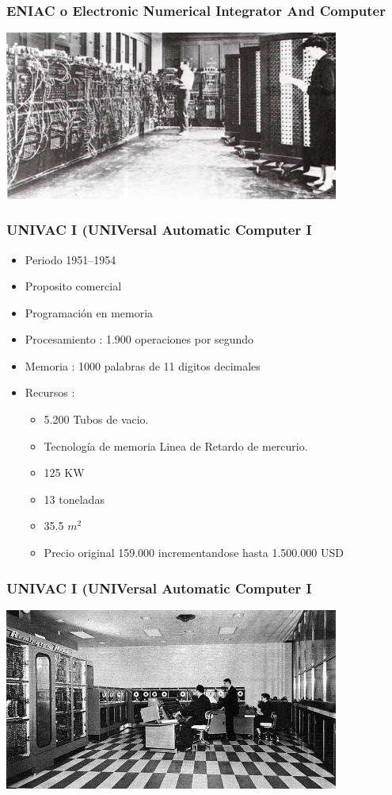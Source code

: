 \documentclass{beamer}
\begin{document}
\begin{frame}
\frametitle{ENIAC o Electronic Numerical Integrator And Computer}
\begin{center}
	\includegraphics[width=11cm]{ENIAC.png}
\end{center}
\end{frame}

\begin{frame}
	\frametitle{UNIVAC I (UNIVersal Automatic Computer I}
	\begin{itemize}
		\item Periodo 1951–1954
		\item Proposito comercial
		\item Programación en memoria
		\item Procesamiento : 1.900 operaciones por segundo
		\item Memoria : 1000 palabras de 11 digitos decimales
		\item Recursos :
			\begin{itemize}
				\item 5.200 Tubos de vacio.
				\item Tecnología de memoria Linea de Retardo de mercurio.
				\item 125 KW
				\item 13 toneladas
				\item 35.5 $m^{2}$
				\item Precio original 159.000 incrementandose hasta 1.500.000 USD
			\end{itemize}
	\end{itemize}
\end{frame}

\begin{frame}
	\frametitle{UNIVAC I (UNIVersal Automatic Computer I}
	\begin{center}
		\includegraphics[width=11cm]{UNIVAC-I-BRL61-0977.jpg}
	\end{center}
\end{frame}
\end{document}

